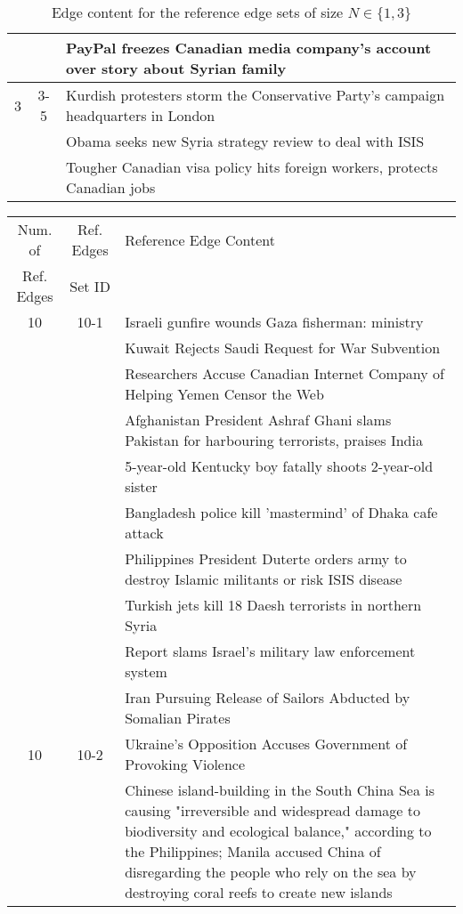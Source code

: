 \begin{table}[H]
\begin{tabular}{cc p{10cm}}
 &  & PayPal freezes Canadian media company's account over story about Syrian family \\
\hline
3 & 3-5 & Kurdish protesters storm the Conservative Party's campaign headquarters in London \\
 &  & Obama seeks new Syria strategy review to deal with ISIS \\
 &  & Tougher Canadian visa policy hits foreign workers, protects Canadian jobs \\
\bottomrule
\end{tabular}
\caption{Edge content for the reference edge sets of size \(N \in \{1, 3\}\)}
\label{tab:ref-edge-sets-nref-1-3}
\end{table}

\begin{table}[H]
\begin{tabular}{cc p{10cm}}
\toprule
\multicolumn{1}{c}{Num. of}			& \multicolumn{1}{c}{Ref. Edges}		& \multicolumn{1}{l}{Reference Edge Content} \\
\multicolumn{1}{c}{Ref. Edges}		& \multicolumn{1}{c}{Set ID}			& \multicolumn{1}{c}{} \\
\midrule
10 & 10-1 & Israeli gunfire wounds Gaza fisherman: ministry \\
 &  & Kuwait Rejects Saudi Request for War Subvention \\
 &  & Researchers Accuse Canadian Internet Company of Helping Yemen Censor the Web \\
 &  & Afghanistan President Ashraf Ghani slams Pakistan for harbouring terrorists, praises India \\
 &  & 5-year-old Kentucky boy fatally shoots 2-year-old sister \\
 &  & Bangladesh police kill 'mastermind' of Dhaka cafe attack \\
 &  & Philippines President Duterte orders army to destroy Islamic militants or risk ISIS disease \\
 &  & Turkish jets kill 18 Daesh terrorists in northern Syria \\
 &  & Report slams Israel's military law enforcement system \\
 &  & Iran Pursuing Release of Sailors Abducted by Somalian Pirates \\
\hline
10 & 10-2 & Ukraine’s Opposition Accuses Government of Provoking Violence \\
 &  & Chinese island-building in the South China Sea is causing "irreversible and widespread damage to biodiversity and ecological balance," according to the Philippines; Manila accused China of disregarding the people who rely on the sea by destroying coral reefs to create new islands \\

\end{tabular}
\end{table}
